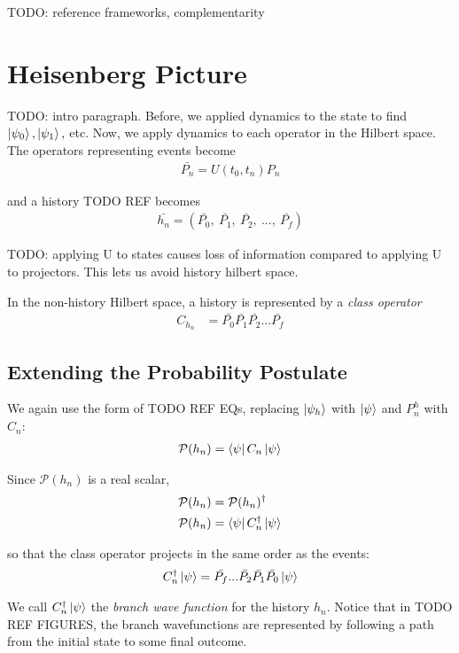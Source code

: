 TODO: reference frameworks, complementarity

\section{Heisenberg Picture}
TODO: intro paragraph. Before, we applied dynamics to the state to find $\ket{\psi_0}, \ket{\psi_1},$ etc. Now, we apply dynamics to each operator in the Hilbert space. The operators representing events become
\begin{align}
  \bar{P_n} = U(t_0, t_n)P_n
\end{align}

and a history TODO REF becomes
\begin{align}
  \bar{h_n} = \left(\bar{P_0}, \: \bar{P_1}, \: \bar{P_2}, \:..., \: \bar{P_f} \right)
\end{align}

TODO: applying U to states causes loss of information compared to applying U to projectors. This lets us avoid history hilbert space.

In the non-history Hilbert space, a history is represented by a \textit{class operator}
\begin{align}
  C_{h_n} &= \bar{P_0} \bar{P_1} \bar{P_2} ... \bar{P_f}
\end{align}

\subsection{Extending the Probability Postulate}

We again use the form of TODO REF EQs, replacing $\ket{\psi_h}$ with $\ket{\psi}$ and $P^h_n$ with $C_n$:
\begin{align}
  \mathcal{P}(h_n) = \bra{\psi} C_n \ket{\psi}
\end{align}

Since $\mathcal{P}(h_n)$ is a real scalar,
\begin{align}
  \mathcal{P}(h_n) &= \mathcal{P}(h_n)^\dagger \\ \nonumber
  \mathcal{P}(h_n) &= \bra{\psi} C_n^\dagger \ket{\psi}
\end{align}

so that the class operator projects in the same order as the events:
\begin{align}
  C_n^\dagger \ket{\psi} = \bar{P_f}...\bar{P_2}\bar{P_1}\bar{P_0}\ket{\psi}
\end{align}

We call $C_n^\dagger \ket{\psi}$ the \textit{branch wave function} for the history $h_n$. Notice that in TODO REF FIGURES, the branch wavefunctions are represented by following a path from the initial state to some final outcome.


